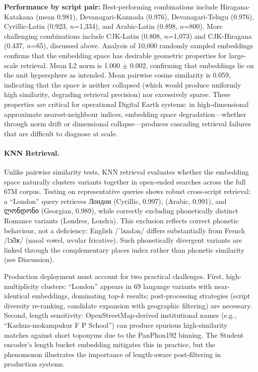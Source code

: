 \documentclass[11pt,a4paper]{article}
\newcommand{\textar}[1]{{\arabicfont\RL{#1}}}
\newcommand{\textgeorgian}[1]{{\georgianfont #1}}
\begin{document}
\textbf{Performance by script pair:} Best-performing combinations include Hiragana-Katakana (mean 0.981), Devanagari-Kannada (0.976), Devanagari-Telugu (0.976), Cyrillic-Latin (0.923, $n$=1,334), and Arabic-Latin (0.898, $n$=800). More challenging combinations include CJK-Latin (0.808, $n$=1,073) and CJK-Hiragana (0.437, $n$=65), discussed above. Analysis of 10,000 randomly sampled embeddings confirms that the embedding space has desirable geometric properties for large-scale retrieval. Mean L2 norm is 1.000 $\pm$ 0.002, confirming that embeddings lie on the unit hypersphere as intended. Mean pairwise cosine similarity is 0.059, indicating that the space is neither collapsed (which would produce uniformly high similarity, degrading retrieval precision) nor excessively sparse. These properties are critical for operational Digital Earth systems: in high-dimensional approximate nearest-neighbour indices, embedding space degradation---whether through norm drift or dimensional collapse---produces cascading retrieval failures that are difficult to diagnose at scale.

\paragraph{KNN Retrieval.} Unlike pairwise similarity tests, KNN retrieval evaluates whether the embedding space naturally clusters variants together in open-ended searches across the full 67M corpus. Testing on representative queries shows robust cross-script retrieval: a ``London'' query retrieves Лондон (Cyrillic, 0.997), \textar{لندون} (Arabic, 0.991), and \textgeorgian{ლონდონი} (Georgian, 0.989), while correctly excluding phonetically distinct Romance variants (Londres, Londra). This exclusion reflects correct phonetic behaviour, not a deficiency: English /ˈlʌndən/ differs substantially from French /lɔ̃dʁ/ (nasal vowel, uvular fricative). Such phonetically divergent variants are linked through the complementary places index rather than phonetic similarity (see Discussion).

Production deployment must account for two practical challenges. First, high-multiplicity clusters: ``London'' appears in 69 language variants with near-identical embeddings, dominating top-$k$ results; post-processing strategies (script diversity re-ranking, candidate expansion with geographic filtering) are necessary. Second, length sensitivity: OpenStreetMap-derived institutional names (e.g., ``Kachua-mokampukur F P School'') can produce spurious high-similarity matches against short toponyms due to the PanPhon192 binning. The Student encoder's length bucket embedding mitigates this in practice, but the phenomenon illustrates the importance of length-aware post-filtering in production systems.
\end{document}
